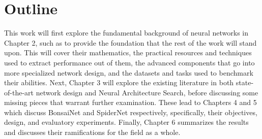 \section{Outline}
This work will first explore the fundamental background of neural networks in Chapter 2, such as to provide the
foundation that the rest of the work will stand upon. This will cover their mathematics, the practical
resources and techniques used to extract performance out of them, the advanced components that go into more specialized network design,
and the datasets and tasks used to benchmark their abilities. Next, Chapter 3 will explore the existing literature in
both state-of-the-art network design and Neural Architecture Search, before discussing some missing pieces that warrant
further examination. These lead to Chapters 4 and 5 which discuss BonsaiNet and SpiderNet respectively, specifically,
their objectives, design, and evaluatory experiments. Finally, Chapter 6
summarizes the results and discusses their ramifications for the field as a whole.
